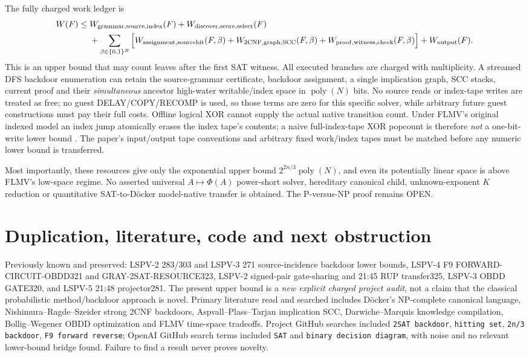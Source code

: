 \documentclass[11pt]{article}
\begin{document}
The fully charged work ledger is
\[
\begin{split}
 W(F)\le{}&W_{\rm grammar,source,index}(F)
 +W_{\rm discover,score,select}(F)\\
 &+\sum_{\beta\in\{0,1\}^{B}}\Big[
 W_{\rm assignment,sourcebit}(F,\beta)
 +W_{\rm 2CNF,graph,SCC}(F,\beta)
 +W_{\rm proof,witness,check}(F,\beta)\Big]
 +W_{\rm output}(F).
\end{split}
\]
This is an upper bound that may count leaves after the first SAT witness. All executed branches are charged with multiplicity. A streamed DFS backdoor enumeration can retain the source-grammar certificate, backdoor assignment, a single implication graph, SCC stacks, current proof and their \emph{simultaneous} ancestor high-water writable/index space in $\operatorname{poly}(N)$ bits. No source reads or index-tape writes are treated as free; no guest DELAY/COPY/RECOMP is used, so those terms are zero for this specific solver, while arbitrary future guest constructions must pay their full costs. Offline logical XOR cannot supply the actual native transition count. Under FLMV's original indexed model an index jump atomically erases the index tape's contents; a naive full-index-tape XOR popcount is therefore \emph{not} a one-bit-write lower bound \cite{flmv2005}. The paper's input/output tape conventions and arbitrary fixed work/index tapes must be matched before any numeric lower bound is transferred.

Most importantly, these resources give only the exponential upper bound $2^{2n/3}\operatorname{poly}(N)$, and even its potentially linear space is above FLMV's low-space regime. No asserted universal $A\mapsto\Phi(A)$ power-short solver, hereditary canonical child, unknown-exponent $K$ reduction or quantitative SAT-to-D\"ocker model-native transfer is obtained. The P-versus-NP proof remains OPEN.

\section{Duplication, literature, code and next obstruction}
Previously known and preserved: LSPV-2 283/303 and LSPV-3 271 source-incidence backdoor lower bounds, LSPV-4 F9 FORWARD-CIRCUIT-OBDD321 and GRAY-2SAT-RESOURCE323, LSPV-2 signed-pair gate-sharing and 21:45 RUP transfer325, LSPV-3 OBDD GATE320, and LSPV-5 21:48 projector281. The present upper bound is a \emph{new explicit charged project audit}, not a claim that the classical probabilistic method/backdoor approach is novel. Primary literature read and searched includes D\"ocker's NP-complete canonical language, Nishimura--Ragde--Szeider strong 2CNF backdoors, Aspvall--Plass--Tarjan implication SCC, Darwiche--Marquis knowledge compilation, Bollig--Wegener OBDD optimization and FLMV time-space tradeoffs. Project GitHub searches included \texttt{2SAT backdoor}, \texttt{hitting set}, \texttt{2n/3 backdoor}, \texttt{F9 forward reverse}; OpenAI GitHub search terms included \texttt{SAT} and \texttt{binary decision diagram}, with noise and no relevant lower-bound bridge found. Failure to find a result never proves novelty.
\end{document}
